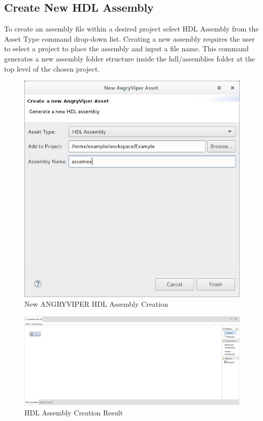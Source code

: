 \begin{flushleft}
\end{flushleft}

\newpage

\subsection{Create New HDL Assembly}
\label{sec:create_assembly}
\begin{flushleft}

To create an assembly file within a desired project select HDL Assembly from the Asset Type command drop-down list. Creating a new assembly requires the user to select a project to place the assembly and input a file name. This command generates a new assembly folder structure inside the hdl/assemblies folder at the top level of the chosen project.\newline
\begin{figure}[h!]
  \centering
  \includegraphics[scale=0.45]{figures/createassembly.jpg}
  \caption{New ANGRYVIPER HDL Assembly Creation}
  \label{fig:figure14}
\end{figure}

\begin{figure}[h!]
  \centering
  \includegraphics[scale=0.31]{figures/assemblyresult.jpg}
  \caption{HDL Assembly Creation Result}
  \label{fig:figure15}
\end{figure}

\end{flushleft}


